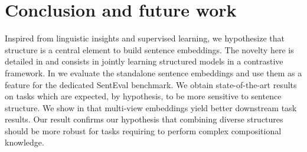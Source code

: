 \section{Conclusion and future work}

Inspired from linguistic insights and supervised learning, we hypothesize that structure is a central element to build sentence embeddings. The novelty here is detailed in  and consists in jointly learning structured models in a contrastive framework. In  we evaluate the standalone sentence embeddings and use them as a feature for the dedicated SentEval benchmark. We obtain state-of-the-art results on tasks which are expected, by hypothesis, to be more sensitive to sentence structure. We show in  that multi-view embeddings yield better downstream task results. Our result confirms our hypothesis that combining diverse structures should be more robust for tasks requiring to perform complex compositional knowledge.